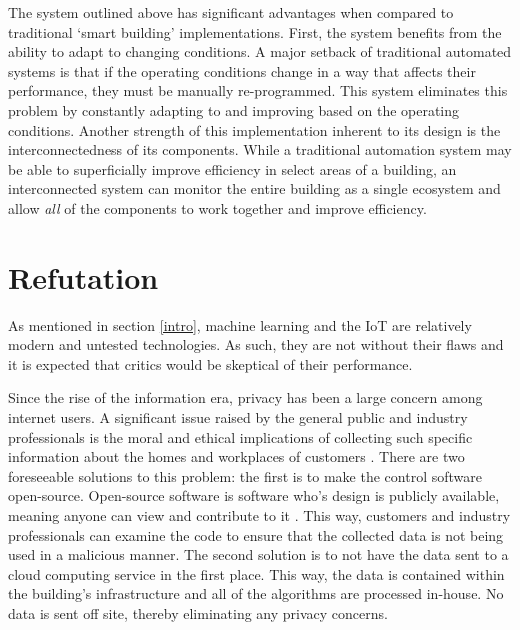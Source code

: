\documentclass[letterpaper]{article}
\begin{document}
The system outlined above has significant advantages when compared to traditional `smart building' implementations. First, the system benefits from the ability to adapt to changing conditions. A major setback of traditional automated systems is that if the operating conditions change in a way that affects their performance, they must be manually re-programmed. This system eliminates this problem by constantly adapting to and improving based on the operating conditions. Another strength of this implementation inherent to its design is the interconnectedness of its components. While a traditional automation system may be able to superficially improve efficiency in select areas of a building, an interconnected system can monitor the entire building as a single ecosystem and allow \emph{all} of the components to work together and improve efficiency.

\section{Refutation} \label{refute}
As mentioned in section \ref{intro}, machine learning and the IoT are relatively modern and untested technologies. As such, they are not without their flaws and it is expected that critics would be skeptical of their performance. \par

Since the rise of the information era, privacy has been a large concern among internet users. A significant issue raised by the general public and industry professionals is the moral and ethical implications of collecting such specific information about the homes and workplaces of customers \cite{perisic16, mccalman17}. There are two foreseeable solutions to this problem: the first is to make the control software open-source. Open-source software is software who's design is publicly available, meaning anyone can view and contribute to it \cite{opensource}. This way, customers and industry professionals can examine the code to ensure that the collected data is not being used in a malicious manner. The second solution is to not have the data sent to a cloud computing service in the first place. This way, the data is contained within the building's infrastructure and all of the algorithms are processed in-house. No data is sent off site, thereby eliminating any privacy concerns. \par
\end{document}
